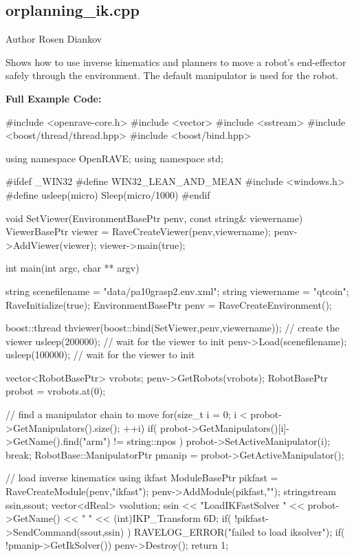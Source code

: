\hypertarget{orplanning__ik.cpp-example}{
\subsection{orplanning\_\-ik.cpp}
}
\begin{DoxyAuthor}{Author}
Rosen Diankov
\end{DoxyAuthor}
Shows how to use inverse kinematics and planners to move a robot's end-\/effector safely through the environment. The default manipulator is used for the robot.

{\bfseries Full Example Code:}


\begin{DoxyCodeInclude}

#include <openrave-core.h>
#include <vector>
#include <sstream>
#include <boost/thread/thread.hpp>
#include <boost/bind.hpp>

using namespace OpenRAVE;
using namespace std;

#ifdef _WIN32
#define WIN32_LEAN_AND_MEAN
#include <windows.h>
#define usleep(micro) Sleep(micro/1000)
#endif

void SetViewer(EnvironmentBasePtr penv, const string& viewername)
{
    ViewerBasePtr viewer = RaveCreateViewer(penv,viewername);
    penv->AddViewer(viewer);
    viewer->main(true);
}

int main(int argc, char ** argv)
{
    string scenefilename = "data/pa10grasp2.env.xml";
    string viewername = "qtcoin";
    RaveInitialize(true);
    EnvironmentBasePtr penv = RaveCreateEnvironment();

    boost::thread thviewer(boost::bind(SetViewer,penv,viewername)); // create the
       viewer
    usleep(200000); // wait for the viewer to init
    penv->Load(scenefilename);
    usleep(100000); // wait for the viewer to init

    vector<RobotBasePtr> vrobots;
    penv->GetRobots(vrobots);
    RobotBasePtr probot = vrobots.at(0);

    // find a manipulator chain to move
    for(size_t i = 0; i < probot->GetManipulators().size(); ++i) {
        if( probot->GetManipulators()[i]->GetName().find("arm") != string::npos )
       {
            probot->SetActiveManipulator(i);
            break;
        }
    }
    RobotBase::ManipulatorPtr pmanip = probot->GetActiveManipulator();

    // load inverse kinematics using ikfast
    ModuleBasePtr pikfast = RaveCreateModule(penv,"ikfast");
    penv->AddModule(pikfast,"");
    stringstream ssin,ssout;
    vector<dReal> vsolution;
    ssin << "LoadIKFastSolver " << probot->GetName() << " " << (int)IKP_Transform
      6D;
    if( !pikfast->SendCommand(ssout,ssin) ) {
        RAVELOG_ERROR("failed to load iksolver\n");
    }
    if( !pmanip->GetIkSolver()) {
        penv->Destroy();
        return 1;
    }

}
\end{DoxyCodeInclude}

